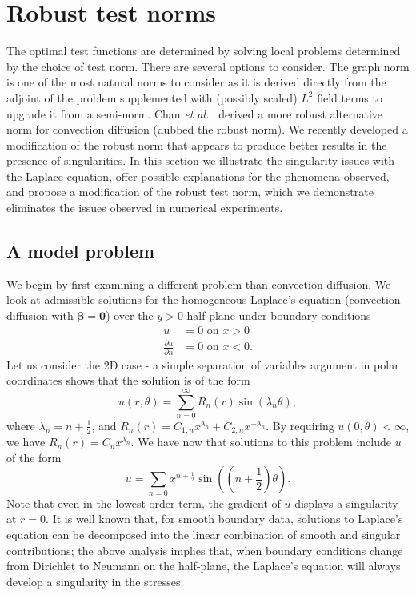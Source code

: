 \documentclass[letterpaper]{article}
\def\bbeta{\boldsymbol\beta}
\newcommand{\bs}[1]{\boldsymbol{#1}}
\newcommand{\seclab}[1]{\label{sec:#1}}
\newcommand{\LRp}[1]{\left( #1 \right)}
\def\etal{{\it et al.~}}
\newcommand{\pd}[2]{\frac{\partial#1}{\partial#2}}
\begin{document}
\section{Robust test norms}
The optimal test functions are determined by solving local problems determined
by the choice of test norm. There are several options to consider.
The graph norm \cite{DPGOverview} is one of the most natural norms to consider
as it is derived directly from the adjoint of the problem supplemented with
(possibly scaled) $L^2$ field terms to upgrade it from a semi-norm.
Chan \etal\cite{ChanHeuerThanhDemkowicz2012} derived a more robust alternative
norm for convection diffusion (dubbed the robust norm). We recently
developed a modification of the robust norm that appears to produce better
results in the presence of singularities. In this section we illustrate the
singularity issues with the Laplace equation, offer possible explanations for
the phenomena observed, and propose a modification of the robust test norm,
which we demonstrate eliminates the issues observed in numerical experiments.

\subsection{A model problem}
\seclab{sec:confusionPlate}
We begin by first examining a different problem than convection-diffusion.
We look at admissible solutions for the homogeneous Laplace's equation
(convection diffusion with $\bbeta=\bs 0$) over
the $y > 0$ half-plane under boundary conditions
\begin{align*}
u &= 0 \text{ on } x > 0\\
\pd{u}{n} &= 0 \text{ on } x < 0.
\end{align*}
Let us consider the 2D case - a simple separation of variables argument in
polar coordinates shows that the solution is of the form
\[
u(r,\theta) = \sum_{n=0}^\infty R_n(r) \sin(\lambda_n \theta),
\]
where $\lambda_n = n + \frac{1}{2}$, and $R_n(r) = C_{1,n}x^{\lambda_n} +
C_{2,n}x^{-\lambda_n}$.  By requiring $u(0,\theta) < \infty$, we have $R_n(r)
= C_n x^{\lambda_n}$.  We have now that solutions to this problem include $u$
of the form
\[
u = \sum_{n=0} x^{n+\frac{1}{2}} \sin\LRp{\LRp{n+\frac{1}{2}}\theta}.
\]
Note that even in the lowest-order term, the gradient of $u$ displays a
singularity at $r = 0$. It is well known that, for smooth boundary data,
solutions to Laplace’s equation can be decomposed into the linear combination
of smooth and singular contributions; the above analysis implies that, when
boundary conditions change from Dirichlet to Neumann on the half-plane, the
Laplace’s equation will always develop a singularity in the stresses.
\end{document}
